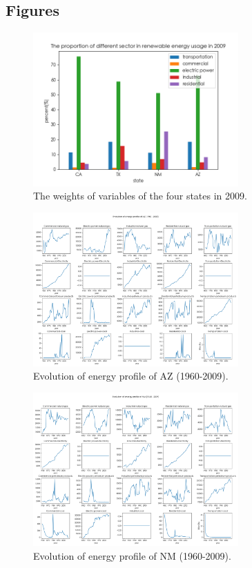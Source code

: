 \documentclass[a4paper,11pt]{article}
\begin{document}
\newpage%
\begin{appendices} 
    \section*{Figures}
\begin{figure}[h]%
    \centering
    \includegraphics[width=0.7\textwidth]{./Pic/1-3.png}
    \caption{The weights of variables of the four states in 2009.}
\end{figure}
\begin{figure}[h]%
    \centering
    \includegraphics[width=0.7\textwidth]{./Pic/B-classify-AZ.png}
    \caption{Evolution of energy profile of AZ (1960-2009).}
    \label{fig:part-2-AZ}
\end{figure}

\begin{figure}[h]%
    \centering 
    \includegraphics[width=0.7\textwidth]{./Pic/B-classify-NM.png}
    \caption{Evolution of energy profile of NM (1960-2009).}
    \label{fig:part-2-NM}  
\end{figure}


\end{appendices}
\end{document}
